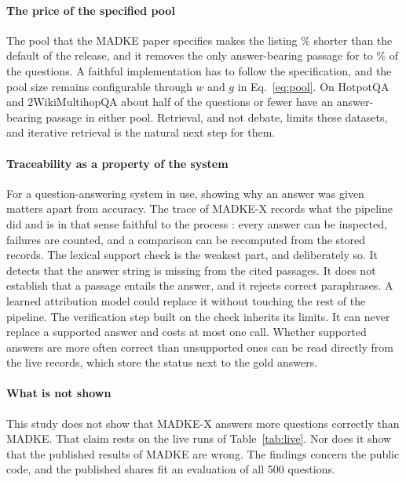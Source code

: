 \paragraph{The price of the specified pool}
The pool that the MADKE paper specifies makes the listing \VTokRedMean\% shorter than the default of the release, and it removes the only answer-bearing passage for \VCoverLossMin{} to \VCoverLossMax\% of the questions. A faithful implementation has to follow the specification, and the pool size remains configurable through $w$ and $g$ in Eq.~\eqref{eq:pool}. On HotpotQA and 2WikiMultihopQA about half of the questions or fewer have an answer-bearing passage in either pool. Retrieval, and not debate, limits these datasets, and iterative retrieval \cite{trivedi2023ircot} is the natural next step for them.

\paragraph{Traceability as a property of the system}
For a question-answering system in use, showing why an answer was given matters apart from accuracy. The trace of MADKE-X records what the pipeline did and is in that sense faithful to the process \cite{jacovi2020faithful}: every answer can be inspected, failures are counted, and a comparison can be recomputed from the stored records. The lexical support check is the weakest part, and deliberately so. It detects that the answer string is missing from the cited passages. It does not establish that a passage entails the answer, and it rejects correct paraphrases. A learned attribution model \cite{rashkin2023attribution,gao2023alce} could replace it without touching the rest of the pipeline. The verification step built on the check inherits its limits. It can never replace a supported answer and costs at most one call. Whether supported answers are more often correct than unsupported ones can be read directly from the live records, which store the status next to the gold answers.

\paragraph{What is not shown}
This study does not show that MADKE-X answers more questions correctly than MADKE. That claim rests on the live runs of Table~\ref{tab:live}. Nor does it show that the published results of MADKE are wrong. The findings concern the public code, and the published shares fit an evaluation of all 500 questions.
